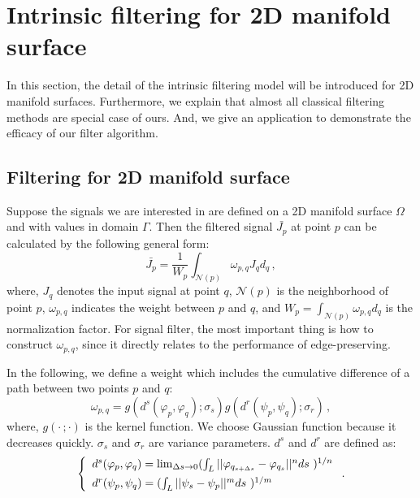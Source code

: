 \section{Intrinsic filtering for 2D manifold surface}

In this section, the detail of the intrinsic filtering model will be introduced for 2D manifold surfaces.
Furthermore, we explain that almost all classical filtering methods are special case of ours. %
And, we give an application to demonstrate the efficacy of our filter algorithm.

\subsection{Filtering for 2D manifold surface}

Suppose the signals we are interested in are defined on a 2D manifold surface $\Omega$ and with values in domain $\Gamma$.
Then the filtered signal $\bar{J_p}$ at point $p$ can be calculated by the following general form:
\begin{equation}
\label{Eq:GeneralForm}
\bar{J_{p}} = \frac{1}{W_{p}}\int_{\mathcal{N}(p)}\omega_{p, q}J_{q}d_{q}\, ,
\end{equation}
where, $J_{q}$ denotes the input signal at point $q$,
$\mathcal{N}(p)$ is the neighborhood of point $p$,
$\omega_{p, q}$ indicates the weight between $p$ and $q$,
and $W_{p} = \int_{\mathcal{N}(p)}\omega_{p, q}d_{q}$ is the normalization factor.%
For signal filter, the most important thing is how to construct $\omega_{p,q}$, since it directly relates to the performance of edge-preserving.

In the following, we define a weight which includes the cumulative difference of a path between two points $p$ and $q$:
\begin{equation}
\label{Eq:IntrinsicWeight}
\omega_{p,q} = g(d^{s}(\varphi_{p}, \varphi_{q}); \sigma_{s})g(d^{r}(\psi_p, \psi_q); \sigma_{r})\, ,
\end{equation}
where,  $g(\cdot \,; \cdot)$ is the kernel function.
We choose Gaussian function because it decreases quickly.
$\sigma_{s}$ and $\sigma_{r}$ are variance parameters.
$d^s$ and $d^r$ are defined as:
 \begin{equation}
 \label{Eq:IntrinsicDistance}
 \left \{
 \begin{array}{ll}
        d^{s}(\varphi_p, \varphi_q) = \lim_{\Delta{s}\to 0} (\int_{L}||\varphi_{q_{s + \Delta{s}}} - \varphi_{q_s}||^{n}ds\,\,)^{1/n} \vspace{1.5mm} \\
        d^{r}(\psi_p, \psi_q) = (\int_{L}||\psi_{s} - \psi_{p}||^{m}ds\,\,)^{1/m} \\
 \end{array}
 \right. .
 \end{equation}

